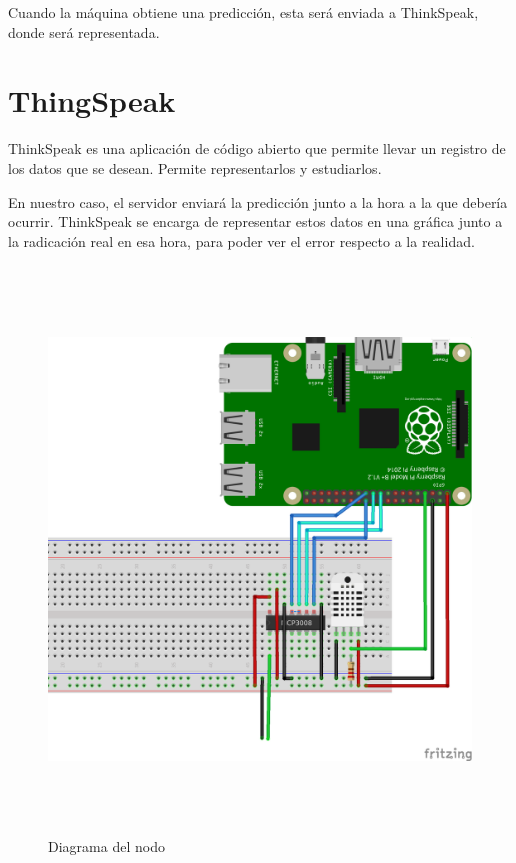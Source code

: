 Cuando la máquina obtiene una predicción, esta será enviada a ThinkSpeak, donde será representada.

\section{ThingSpeak}
\label{makereference2.4}

ThinkSpeak es una aplicación de código abierto que permite llevar un registro de los datos que se desean. Permite representarlos y estudiarlos.

En nuestro caso, el servidor enviará la predicción junto a la hora a la que debería ocurrir. ThinkSpeak se encarga de representar estos datos en una gráfica junto a la radicación real en esa hora, para poder ver el error respecto a la realidad.

\begin{figure}[htb]
	
	\begin{center}
		\includegraphics[width=15cm,height=15cm]{figures/solar_project_node_diagram.png}
		\caption{Diagrama del nodo}
	\end{center}
	
	\label{figure2}
\end{figure}